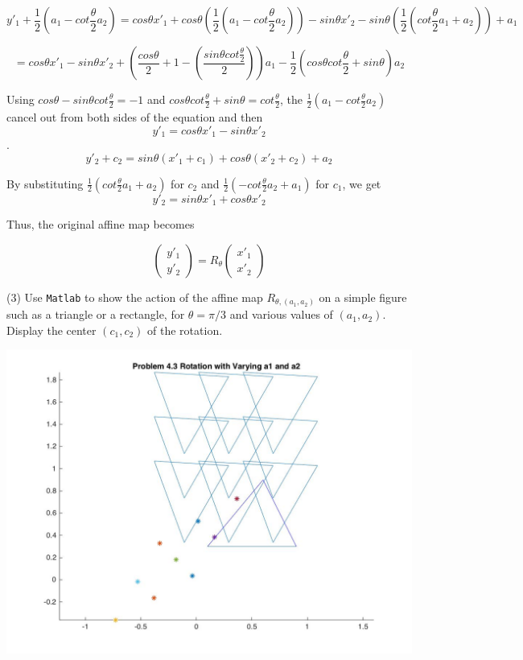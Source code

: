 \documentclass[12pt]{article}
\begin{document}
\[y'_1 + \frac{1}{2}(a_1 - cot\frac{\theta}{2} a_2) =  cos\theta x'_1 + cos\theta (\frac{1}{2}(a_1 - cot \frac{\theta}{2} a_2)) - sin\theta x'_2 - sin\theta (\frac{1}{2} (cot \frac{\theta}{2}a_1 + a_2)) + a_1 \]

$$ = cos\theta x'_1  - sin\theta x'_2 + (\frac {cos\theta}{2} + 1 - (\frac{sin\theta cot \frac{\theta}{2}}{2} ))a_1 - \frac{1}{2}(cos\theta cot \frac{\theta}{2} + sin\theta) a_2$$

Using $cos\theta - sin\theta cot \frac{\theta}{2} = -1$ and $cos\theta cot \frac{\theta}{2} + sin\theta = cot \frac{\theta}{2}$, the $\frac{1}{2} (a_1 - cot \frac{\theta}{2}a_2)$ cancel out from both sides of the equation and then $$y'_1 = cos\theta x'_1 - sin\theta x'_2$$.
$$y'_2 + c_2 = sin\theta (x'_1+ c_1) + cos\theta (x'_2 +c_2) + a_2$$

By substituting $\frac{1}{2} \left( cot \frac{\theta}{2} a_1+a_2 \right)$ for $c_2$ and $\frac{1}{2} \left( -cot \frac{\theta}{2} a_2+a_1 \right)$ for $c_1$, we get\\ 

 $$y'_2 = sin\theta x'_1 + cos\theta x'_2$$
 
 Thus, the original affine map becomes 
 
 $$ \begin{pmatrix}y'_1 \\y'_2\end{pmatrix}= R_\theta \begin{pmatrix}x'_1 \\x'_2\end{pmatrix}$$

\medskip
(3)
Use {\tt Matlab} to show the action of  the affine map
$R_{\theta, (a_1,a_2)}$ on a simple figure such as
a triangle or a rectangle,
for $\theta = \pi/3$ and various values of $(a_1, a_2)$.
Display the center $(c_1, c_2)$ of the rotation.

\includegraphics[scale=.25]{Plot4_3}
\end{document}
